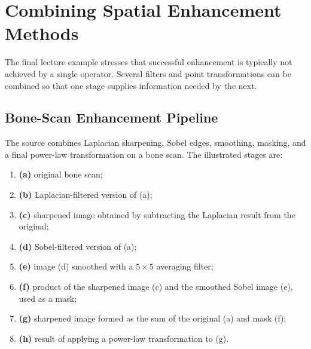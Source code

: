 \documentclass[11pt,a4paper,oneside]{report}
\begin{document}
\chapter{Combining Spatial Enhancement Methods}

The final lecture example stresses that successful enhancement is typically not achieved by a single operator. Several filters and point transformations can be combined so that one stage supplies information needed by the next.

\section{Bone-Scan Enhancement Pipeline}

The source combines Laplacian sharpening, Sobel edges, smoothing, masking, and a final power-law transformation on a bone scan. The illustrated stages are:
\begin{enumerate}
  \item \textbf{(a)} original bone scan;
  \item \textbf{(b)} Laplacian-filtered version of (a);
  \item \textbf{(c)} sharpened image obtained by subtracting the Laplacian result from the original;
  \item \textbf{(d)} Sobel-filtered version of (a);
  \item \textbf{(e)} image (d) smoothed with a $5\times5$ averaging filter;
  \item \textbf{(f)} product of the sharpened image (c) and the smoothed Sobel image (e), used as a mask;
  \item \textbf{(g)} sharpened image formed as the sum of the original (a) and mask (f);
  \item \textbf{(h)} result of applying a power-law transformation to (g).
\end{enumerate}
\end{document}
